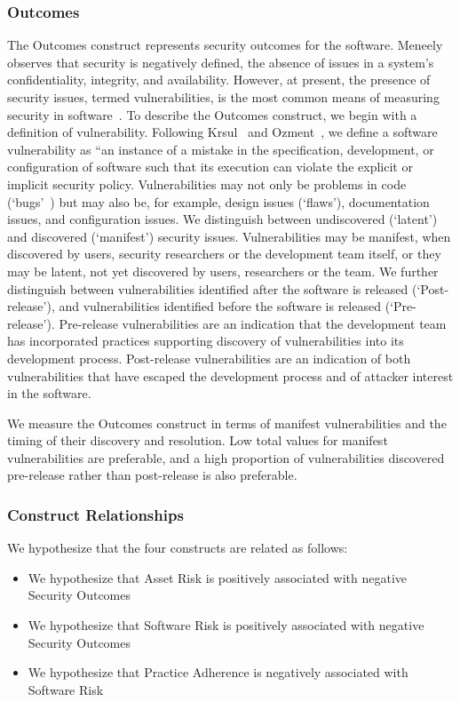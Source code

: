 \subsubsection{Outcomes}
\label{sec:model_contruct_outcome}
The Outcomes construct represents security outcomes for the software. Meneely~\cite{meneely2016security} observes that security is negatively defined, the absence of issues in a system's confidentiality, integrity, and availability. 
However, at present, the presence of security issues, termed vulnerabilities, is the most common means of measuring security in software~\cite{morrison2014mapping}.
To describe the Outcomes construct, we begin with a definition of vulnerability. Following Krsul~\cite{krsul1998software} and Ozment~\cite{ozment2007vulnerability}, we define a software vulnerability as “an instance of a mistake in the specification, development, or configuration of software such that its execution can violate the explicit or implicit security policy.  Vulnerabilities may not only be problems in code (`bugs'~\cite{mcgraw2006software}) but may also be, for example, design issues (`flaws'), documentation issues, and configuration issues.  We distinguish between undiscovered (`latent') and discovered (`manifest') security issues.  Vulnerabilities may be manifest, when discovered by users, security researchers or the development team itself, or they may be latent, not yet discovered by users, researchers or the team. We further distinguish between vulnerabilities identified after the software is released (`Post-release'), and vulnerabilities identified before the software is released (`Pre-release'). Pre-release vulnerabilities are an indication that the development team has incorporated practices supporting discovery of vulnerabilities into its development process. Post-release vulnerabilities are an indication of both vulnerabilities that have escaped the development process and of attacker interest in the software. 

We measure the Outcomes construct in terms of manifest vulnerabilities and the timing of their discovery and resolution. Low total values for manifest vulnerabilities are preferable, and a high proportion of vulnerabilities discovered pre-release rather than post-release is also preferable. 

\subsubsection{Construct Relationships}
We hypothesize that the four constructs are related as follows:
\begin{itemize}
	\item We hypothesize that Asset Risk is positively associated with negative Security Outcomes
	\item We hypothesize that Software Risk is positively associated with negative Security Outcomes
	\item We hypothesize that Practice Adherence is negatively associated with Software Risk 	
\end{itemize}

